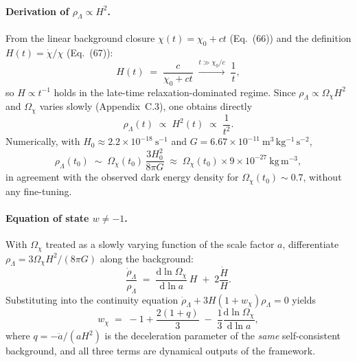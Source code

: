     \paragraph{Derivation of $\rho_\Lambda \propto H^2$.}
      From the linear background closure $\chi(t) = \chi_0 + ct$ (Eq.~(66))
      and the definition $H(t) = \dot\chi/\chi$ (Eq.~(67)):
    \begin{equation}
      \label{eq:rc-H-explicit}
      H(t) \;=\; \frac{c}{\chi_0 + ct}
      \;\xrightarrow{t \gg \chi_0/c}\; \frac{1}{t},
      \end{equation}
      so $H \propto t^{-1}$ holds in the late-time relaxation-dominated
      regime.
      Since $\rho_\Lambda \propto \Omega_\chi H^2$ and $\Omega_\chi$ varies
      slowly (Appendix~C.3), one obtains directly
    \begin{equation}
      \label{eq:rc-rho-H2}
      \rho_\Lambda(t)
      \;\propto\; H^2(t)
      \;\propto\; \frac{1}{t^2}.
      \end{equation}
      Numerically, with $H_0 \approx 2.2 \times 10^{-18}~\mathrm{s}^{-1}$
      and $G = 6.67 \times 10^{-11}~\mathrm{m^3\,kg^{-1}\,s^{-2}}$,
    \begin{equation}
      \label{eq:rc-rho-num}
      \rho_\Lambda(t_0)
      \;\sim\;
      \Omega_\chi(t_0)\,\frac{3 H_0^2}{8\pi G}
      \;\approx\;
      \Omega_\chi(t_0)\times 9 \times 10^{-27}~\mathrm{kg\,m^{-3}},
      \end{equation}
      in agreement with the observed dark energy density for
      $\Omega_\chi(t_0) \sim 0.7$, without any fine-tuning.

    \paragraph{Equation of state $w \neq -1$.}
      With $\Omega_\chi$ treated as a slowly varying function of the scale
      factor $a$, differentiate $\rho_\Lambda = 3\Omega_\chi H^2/(8\pi G)$
      along the background:
    \begin{equation}
      \label{eq:rc-rhodot}
      \frac{\dot\rho_\Lambda}{\rho_\Lambda}
      \;=\; \frac{\mathrm{d}\ln\Omega_\chi}{\mathrm{d}\ln a}\,H
      \;+\; 2\frac{\dot H}{H}.
      \end{equation}
      Substituting into the continuity equation
      $\dot\rho_\Lambda + 3H(1+w_\chi)\rho_\Lambda = 0$ yields
    \begin{equation}
      \label{eq:rc-w}
      w_\chi
      \;=\; -1 + \frac{2(1+q)}{3}
      \;-\; \frac{1}{3}\frac{\mathrm{d}\ln\Omega_\chi}{\mathrm{d}\ln a},
      \end{equation}
      where $q = -\ddot{a}/(aH^2)$ is the deceleration parameter of the
      \emph{same} self-consistent background, and all three terms are
      dynamical outputs of the framework.


